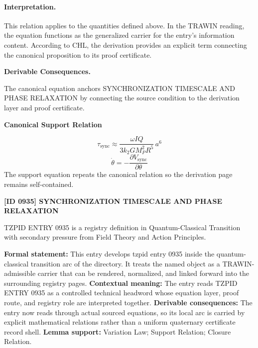 \paragraph{Interpretation.}
This relation applies to the quantities defined above. In the TRAWIN reading, the equation functions as the generalized carrier for the entry’s information content. According to CHL, the derivation provides an explicit term connecting the canonical proposition to its proof certificate.

\par\vspace{0.35em}
\noindent\textbf{Derivable Consequences.}\quad
\begingroup
\footnotesize
\raggedright
The canonical equation anchors SYNCHRONIZATION TIMESCALE AND PHASE RELAXATION by connecting the source condition to the derivation layer and proof certificate.
\par\endgroup

\noindent\textbf{Canonical Support Relation}\par
\[
\tau_{\mathrm{sync}}\approx \frac{\omega I Q}{3k_2GM_P^2R^5}\,a^6
\]
\[
\dot{\theta}=-\frac{\partial V_{\mathrm{sync}}}{\partial\theta}
\]
\noindent The support equation repeats the canonical relation so the derivation page remains self-contained.\par

\clearpage
\noindent\textbf{[ID 0935] SYNCHRONIZATION TIMESCALE AND PHASE RELAXATION}\par
\vspace{0.35em}
\begingroup\small
{}
TZPID ENTRY 0935 is a registry definition in Quantum-Classical Transition with secondary pressure from Field Theory and Action Principles.

\begingroup\footnotesize\setlength{\emergencystretch}{3em}\sloppy
\textbf{Formal statement:} This entry develops tzpid entry 0935 inside the quantum-classical transition arc of the directory. It treats the named object as a TRAWIN-admissible carrier that can be rendered, normalized, and linked forward into the surrounding registry pages. \textbf{Contextual meaning:} The entry reads TZPID ENTRY 0935 as a controlled technical headword whose equation layer, proof route, and registry role are interpreted together. \textbf{Derivable consequences:} The entry now reads through actual sourced equations, so its local arc is carried by explicit mathematical relations rather than a uniform quaternary certificate record shell. \textbf{Lemma support:} Variation Law; Support Relation; Closure Relation.\par
\endgroup

